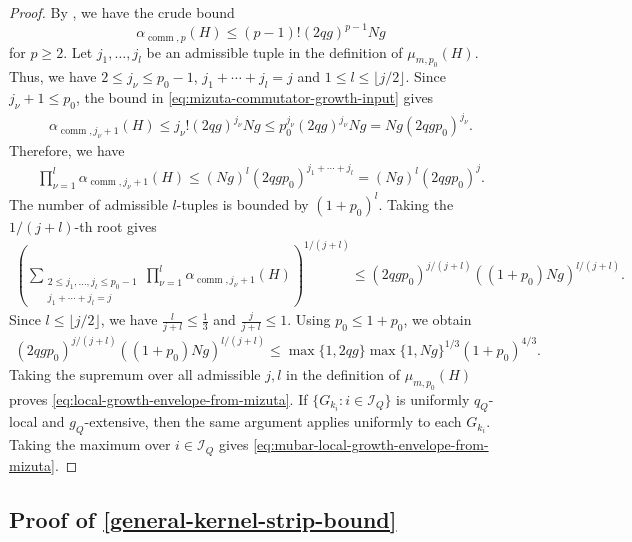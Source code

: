 \documentclass[10pt,reqno]{article}
\numberwithin{equation}{section}
\theoremstyle{plain}
\theoremstyle{definition}
\begin{document}
\begin{proof}
By \cite[Equation 8]{mizuta2025commutatorscalinghamiltoniansimulation}, we have the crude bound
\begin{equation}
\alpha_{\operatorname{comm},p}(H) \leq (p-1)!(2qg)^{p-1}Ng
\label{eq:mizuta-commutator-growth-input}
\end{equation}
for $p\geq 2$. Let \(j_1,\ldots,j_l\) be an admissible tuple in the definition of \(\mu_{m,p_0}(H)\). Thus, we have $2\leq j_\nu\leq p_0-1$, $j_1+\cdots+j_l=j$ and $1\leq l\leq \lfloor j/2\rfloor$. Since \(j_\nu+1\leq p_0\), the bound in \cref{eq:mizuta-commutator-growth-input} gives
\begin{align}
\alpha_{\operatorname{comm},j_\nu+1}(H) \leq j_\nu!(2qg)^{j_\nu}Ng \leq p_0^{j_\nu}(2qg)^{j_\nu}Ng = Ng(2qg p_0)^{j_\nu}.
\end{align}
Therefore, we have
\begin{align}
\prod_{\nu=1}^{l} \alpha_{\operatorname{comm},j_\nu+1}(H) \leq (Ng)^l(2qg p_0)^{j_1+\cdots+j_l} = (Ng)^l(2qg p_0)^j.
\end{align}
The number of admissible \(l\)-tuples is bounded by \((1+p_0)^l\). Taking the \(1/(j+l)\)-th root gives
\begin{align}
\left( \sum_{\substack{ 2\leq j_1,\ldots,j_l\leq p_0-1\\ j_1+\cdots+j_l=j}} \prod_{\nu=1}^{l} \alpha_{\operatorname{comm},j_\nu+1}(H) \right)^{1/(j+l)}  \leq (2qg p_0)^{j/(j+l)} \left((1+p_0)Ng\right)^{l/(j+l)} . \label{eq:root-alpha-local-growth-bound}
\end{align}
Since \(l\leq \lfloor j/2\rfloor\), we have $\frac{l}{j+l}\leq \frac13$ and $\frac{j}{j+l}\leq 1$. Using \(p_0\leq1+p_0\), we obtain
\begin{align}
(2qg p_0)^{j/(j+l)} \left((1+p_0)Ng\right)^{l/(j+l)}  \leq \max\{1,2qg\}\max\{1,Ng\}^{1/3}(1+p_0)^{4/3}.
\end{align}
Taking the supremum over all admissible \(j,l\) in the definition of \(\mu_{m,p_0}(H)\) proves \cref{eq:local-growth-envelope-from-mizuta}. If \(\{G_{k_i}:i\in \mathcal I_Q\}\) is uniformly \(q_Q\)-local and \(g_Q\)-extensive, then the same argument applies uniformly to each \(G_{k_i}\). Taking the maximum over \(i\in \mathcal I_Q\) gives \cref{eq:mubar-local-growth-envelope-from-mizuta}.
\end{proof}


\subsection{Proof of \cref{general-kernel-strip-bound}}\label{proof-of-general-kernel-strip-bound}
\end{document}
